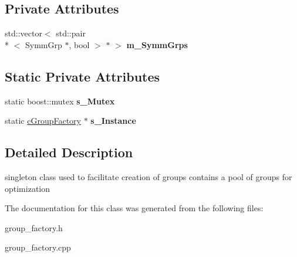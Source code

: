 \subsection*{Private Attributes}
\begin{DoxyCompactItemize}
\item 
\hypertarget{classcGroupFactory_a971617f9dd69295a27aede82781d3a8e}{std\-::vector$<$ std\-::pair\\*
$<$ Symm\-Grp $\ast$, bool $>$ $\ast$ $>$ {\bfseries m\-\_\-\-Symm\-Grps}}\label{classcGroupFactory_a971617f9dd69295a27aede82781d3a8e}

\end{DoxyCompactItemize}
\subsection*{Static Private Attributes}
\begin{DoxyCompactItemize}
\item 
\hypertarget{classcGroupFactory_abc9e8708326d158987ac8665b672be25}{static boost\-::mutex {\bfseries s\-\_\-\-Mutex}}\label{classcGroupFactory_abc9e8708326d158987ac8665b672be25}

\item 
\hypertarget{classcGroupFactory_aee9b5a04dd76633ef13aa16caa9ad310}{static \hyperlink{classcGroupFactory}{c\-Group\-Factory} $\ast$ {\bfseries s\-\_\-\-Instance}}\label{classcGroupFactory_aee9b5a04dd76633ef13aa16caa9ad310}

\end{DoxyCompactItemize}


\subsection{Detailed Description}
singleton class used to facilitate creation of groups contains a pool of groups for optimization 

The documentation for this class was generated from the following files\-:\begin{DoxyCompactItemize}
\item 
group\-\_\-factory.\-h\item 
group\-\_\-factory.\-cpp\end{DoxyCompactItemize}

